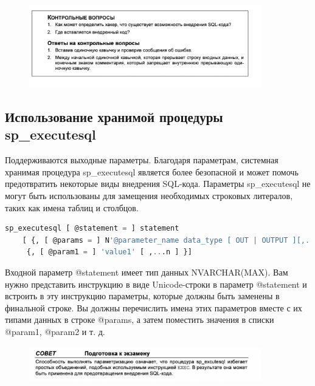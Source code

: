 \begin{figure}[h!]
	\begin{center}
		\includegraphics[width=0.9\textwidth]{img/control36.png}
	\end{center}
	\captionsetup{justification=centering}
\end{figure}


\subsection{Использование хранимой процедуры sp\_executesql}


Поддерживаются выходные параметры. Благодаря параметрам, системная хранимая процедура sp\_executesql является более безопасной и может помочь предотвратить некоторые виды внедрения SQL-кода. Параметры sp\_executesql не могут быть
использованы для замещения необходимых строковых литералов, таких как имена
таблиц и столбцов. 


\begin{lstlisting}[label=lst:funcReturn, language=sql]
	sp_executesql [ @statement = ] statement
	[ {, [ @params = ] N'@parameter_name data_type [ OUT | OUTPUT ][,...n ]' }
	 {, [ @param1 = ] 'value1' [ ,...n ] }] 
\end{lstlisting}

Входной параметр @statement имеет тип данных NVARCHAR(MAX). Вам нужно представить инструкцию в виде Unicode-строки в параметр @statement и встроить в эту
инструкцию параметры, которые должны быть заменены в финальной строке. Вы
должны перечислить имена этих параметров вместе с их типами данных в строке
@params, а затем поместить значения в списки @param1, @param2 и т. д. 


\begin{figure}[h!]
	\begin{center}
		\includegraphics[width=0.9\textwidth]{img/advice31.png}
	\end{center}
	\captionsetup{justification=centering}
\end{figure}



